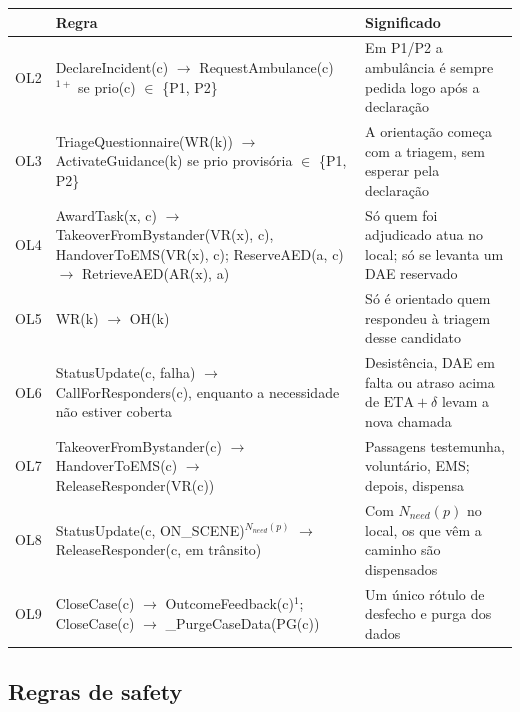 \documentclass[10pt,a4paper]{article}
\begin{document}
{\small
\begin{xltabular}{\linewidth}{@{}lTL@{}}
\toprule
& \normalfont Regra & Significado \\
\midrule
\endhead
OL2 & DeclareIncident(c) $\rightarrow$ RequestAmbulance(c)$^{1+}$ se prio(c) $\in$ \{P1, P2\} & Em P1/P2 a ambulância é sempre pedida logo após a declaração \\
OL3 & TriageQuestionnaire(WR(k)) $\rightarrow$ ActivateGuidance(k) se prio provisória $\in$ \{P1, P2\} & A orientação começa com a triagem, sem esperar pela declaração \\
OL4 & AwardTask(x, c) $\rightarrow$ TakeoverFromBystander(VR(x), c), HandoverToEMS(VR(x), c); ReserveAED(a, c) $\rightarrow$ RetrieveAED(AR(x), a) & Só quem foi adjudicado atua no local; só se levanta um DAE reservado \\
OL5 & WR(k) $\rightarrow$ OH(k) & Só é orientado quem respondeu à triagem desse candidato \\
OL6 & StatusUpdate(c, falha) $\rightarrow$ CallForResponders(c), enquanto a necessidade não estiver coberta & Desistência, DAE em falta ou atraso acima de $\mathrm{ETA}+\delta$ levam a nova chamada \\
OL7 & TakeoverFromBystander(c) $\rightarrow$ HandoverToEMS(c) $\rightarrow$ ReleaseResponder(VR(c)) & Passagens testemunha, voluntário, EMS; depois, dispensa \\
OL8 & StatusUpdate(c, ON\_SCENE)$^{N_{need}(p)}$ $\rightarrow$ ReleaseResponder(c, em trânsito) & Com $N_{need}(p)$ no local, os que vêm a caminho são dispensados \\
OL9 & CloseCase(c) $\rightarrow$ OutcomeFeedback(c)$^{1}$; CloseCase(c) $\rightarrow$ \_PurgeCaseData(PG(c)) & Um único rótulo de desfecho e purga dos dados \\
\bottomrule
\end{xltabular}
}

\subsection{Regras de safety}\label{sec:safety}
\end{document}
